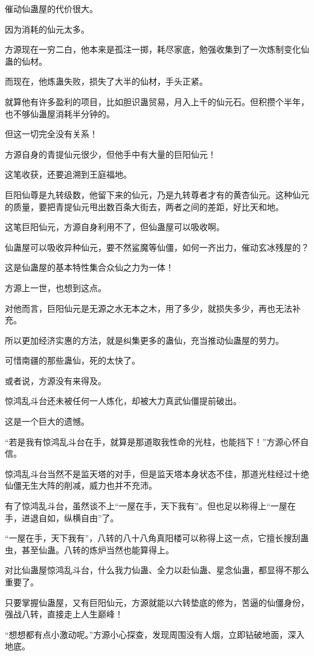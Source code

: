 \begin{this_body}
催动仙蛊屋的代价很大。

因为消耗的仙元太多。

方源现在一穷二白，他本来是孤注一掷，耗尽家底，勉强收集到了一次炼制变化仙蛊的仙材。

而现在，他炼蛊失败，损失了大半的仙材，手头正紧。

就算他有许多盈利的项目，比如胆识蛊贸易，月入上千的仙元石。但积攒个半年，也不够仙蛊屋消耗半分钟的。

但这一切完全没有关系！

方源自身的青提仙元很少，但他手中有大量的巨阳仙元！

这笔收获，还要追溯到王庭福地。

巨阳仙尊是九转级数，他留下来的仙元，乃是九转尊者才有的黄杏仙元。这种仙元的质量，要把青提仙元甩出数百条大街去，两者之间的差距，好比天和地。

这笔巨阳仙元，方源自身利用不了，但仙蛊屋可以吸收啊。

仙蛊屋可以吸收异种仙元，要不然鲨魔等仙僵，如何一齐出力，催动玄冰残屋的？

这是仙蛊屋的基本特性集合众仙之力为一体！

方源上一世，也想到这点。

对他而言，巨阳仙元是无源之水无本之木，用了多少，就损失多少，再也无法补充。

所以更加经济实惠的方法，就是纠集更多的蛊仙，充当推动仙蛊屋的劳力。

可惜南疆的那些蛊仙，死的太快了。

或者说，方源没有来得及。

惊鸿乱斗台还未被任何一人炼化，却被大力真武仙僵提前破出。

这是一个巨大的遗憾。

“若是我有惊鸿乱斗台在手，就算是那道取我性命的光柱，也能挡下！”方源心怀自信。

惊鸿乱斗台当然不是监天塔的对手，但是监天塔本身状态不佳，那道光柱经过十绝仙僵无生大阵的削减，威力也并不充沛。

有了惊鸿乱斗台，虽然谈不上“一屋在手，天下我有”。但也足以称得上“一屋在手，进退自如，纵横自由”了。

“一屋在手，天下我有”，八转的八十八角真阳楼可以称得上这一点，它擅长搜刮蛊虫，甚至仙蛊。八转的炼炉当然也能算得上。

对比仙蛊屋惊鸿乱斗台，什么我力仙蛊、全力以赴仙蛊、星念仙蛊，都显得不那么重要了。

只要掌握仙蛊屋，又有巨阳仙元，方源就能以六转垫底的修为，苦逼的仙僵身份，强战八转，直接走上人生巅峰！

“想想都有点小激动呢。”方源小心探查，发现周围没有人烟，立即钻破地面，深入地底。

\end{this_body}

